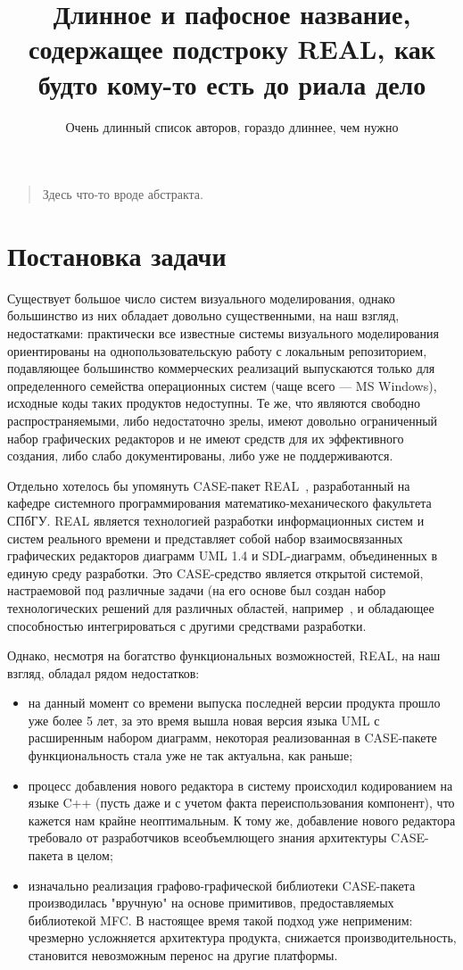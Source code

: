 \documentclass[a5paper]{article}
\title{Длинное и пафосное название, содержащее подстроку REAL, как будто кому-то есть до риала дело}
\author{Очень длинный список авторов, гораздо длиннее, чем нужно}
\date{}
\begin{document}
\maketitle
\thispagestyle{empty}

\begin{quote}
\small\noindent
Здесь что-то вроде абстракта.
\end{quote}

\section{Постановка задачи}
Существует большое число систем визуального моделирования, однако
большинство из них обладает довольно существенными, на наш взгляд,
недостатками: практически все известные системы визуального
моделирования ориентированы на однопользовательскую работу с локальным
репозиторием, подавляющее большинство коммерческих реализаций
выпускаются только для определенного семейства операционных систем
(чаще всего --- MS Windows), исходные коды таких продуктов недоступны. Те
же, что являются свободно распространяемыми, либо недостаточно зрелы,
имеют довольно ограниченный набор графических редакторов и не имеют
средств для их эффективного создания, либо слабо документированы, либо
уже не поддерживаются.

Отдельно хотелось бы упомянуть CASE-пакет REAL~\cite{real}, разработанный на
кафедре системного программирования математико-механического факультета
СПбГУ. REAL является технологией разработки информационных систем и
систем реального времени и представляет собой набор взаимосвязанных
графических редакторов диаграмм UML 1.4 и SDL-диаграмм, объединенных в
единую среду разработки. Это CASE-средство является открытой системой,
настраемовой под различные задачи (на его основе был создан набор
технологических решений для различных областей, например~\cite{realIt}, и
обладающее способностью интегрироваться с другими средствами
разработки.

Однако, несмотря на богатство функциональных возможностей,
REAL, на наш взгляд, обладал рядом недостатков:

\begin{itemize}
  \item на данный момент со времени выпуска последней версии продукта прошло уже
    более 5 лет, за это время вышла новая версия языка
	UML с расширенным набором диаграмм,
	некоторая реализованная в CASE-пакете
	функциональность стала уже не так актуальна, как раньше;
  \item процесс добавления нового редактора в систему происходил кодированием на
	языке C++ (пусть даже и с учетом факта
	переиспользования компонент), что кажется нам крайне неоптимальным. К
	тому же, добавление нового редактора требовало от разработчиков
	всеобъемлющего знания архитектуры
	CASE-пакета в целом;
  \item изначально реализация графово-графической библиотеки
	CASE-пакета производилась "вручную" на
	основе примитивов, предоставляемых библиотекой
	MFC. В настоящее время такой подход уже
	неприменим: чрезмерно усложняется архитектура продукта, снижается
	производительность, становится невозможным перенос на другие
	платформы.
\end{itemize}
\end{document}
